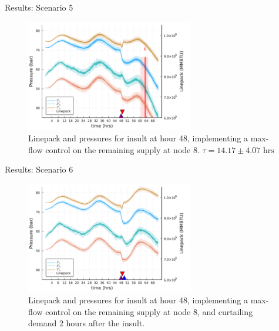 \begin{frame}{Results: Scenario 5}
  \begin{figure}
    \centering
    \includegraphics[width=0.65\textwidth]{ScenarioResults/scen5.png}
    \caption{Linepack and pressures for insult at hour 48, implementing a max-flow control on the remaining supply at node 8. $\tau = 14.17 \pm 4.07 \text{ hrs}$}
  \end{figure}
\end{frame}

\begin{frame}{Results: Scenario 6}
  \begin{figure}
    \centering
    \includegraphics[width=0.65\textwidth]{ScenarioResults/scen6.png}
    \caption{Linepack and pressures for insult at hour 48, implementing a max-flow control on the remaining supply at node 8, and curtailing demand 2 hours after the insult.}
  \end{figure}
\end{frame}

